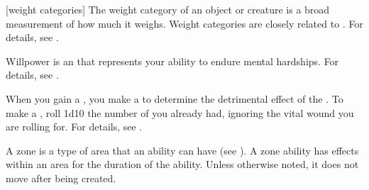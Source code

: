 [weight categories] The weight category of an object or creature is a broad measurement of how much it weighs.
Weight categories are closely related to .
For details, see .

 Willpower is an  that represents your ability to endure mental hardships.
For details, see .

 When you gain a , you make a  to determine the detrimental effect of the .
To make a , roll 1d10 \sub the number of  you already had, ignoring the vital wound you are rolling for.
For details, see .

 A zone is a type of area that an ability can have (see ).
A zone ability has effects within an area for the duration of the ability.
Unless otherwise noted, it does not move after being created.
